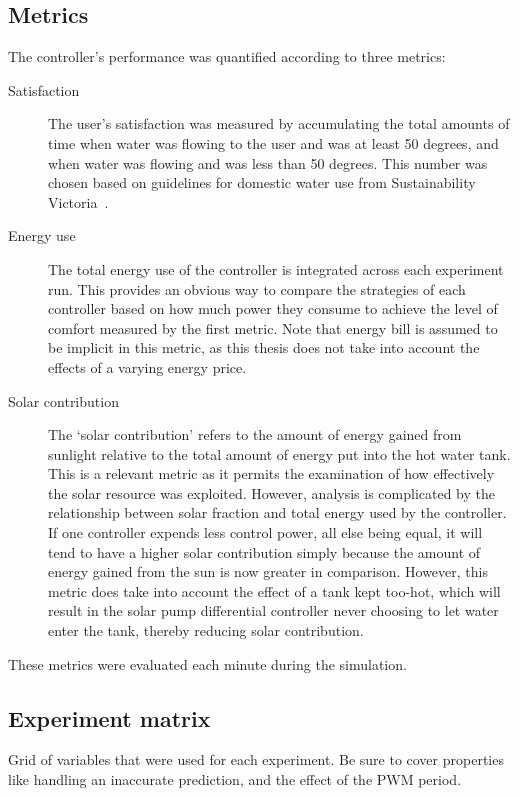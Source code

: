 \subsection{Metrics}

The controller's performance was quantified according to three metrics:

\begin{description}
	\item[Satisfaction]
		The user's satisfaction was measured by accumulating the total amounts of time when water was flowing to the user and was at least 50 degrees, and when water was flowing and was less than 50 degrees.
		This number was chosen based on guidelines for domestic water use from Sustainability Victoria~\cite{LSTS}.
	\item[Energy use]
		The total energy use of the controller is integrated across each experiment run.
		This provides an obvious way to compare the strategies of each controller based on how much power they consume to achieve the level of comfort measured by the first metric.
		Note that energy bill is assumed to be implicit in this metric, as this thesis does not take into account the effects of a varying energy price.
	\item[Solar contribution]
		The `solar contribution' refers to the amount of energy gained from sunlight relative to the total amount of energy put into the hot water tank.
		This is a relevant metric as it permits the examination of how effectively the solar resource was exploited.
		However, analysis is complicated by the relationship between solar fraction and total energy used by the controller.
		If one controller expends less control power, all else being equal, it will tend to have a higher solar contribution simply because the amount of energy gained from the sun is now greater in comparison.
		However, this metric does take into account the effect of a tank kept too-hot, which will result in the solar pump differential controller never choosing to let water enter the tank, thereby reducing solar contribution.
\end{description}

These metrics were evaluated each minute during the simulation.

\subsection{Experiment matrix}

Grid of variables that were used for each experiment.
Be sure to cover properties like handling an inaccurate prediction, and the effect of the PWM period.
